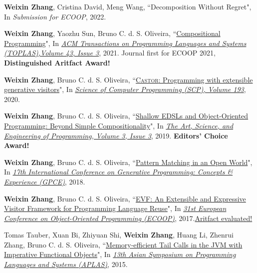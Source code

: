 \documentclass[paper=letter,fontsize=11pt]{scrartcl} %
\newcommand{\PaperEntry}[4]{
		\noindent #1, ``{#2}", In \textit{#3}, #4.} %
\begin{document}
\begin{etaremune}

\item \PaperEntry{\textbf{Weixin Zhang}, Cristina David, Meng Wang}{Decomposition Without Regret}{Submission for ECOOP}{2022}

\item \PaperEntry{\textbf{Weixin Zhang}, Yaozhu Sun, Bruno C. d. S.
    Oliveira}{\href{https://wxzh.github.io/papers/toplas2021.pdf}{Compositional Programming}}{\href{https://dx.doi.org/10.1145/3460228}{ACM Transactions on Programming Languages and Systems (TOPLAS),Volume 43, Issue 3}}{2021}{ Journal first for ECOOP 2021, \textbf{Distinguished Aritfact Award!}}

\item \PaperEntry{\textbf{Weixin Zhang}, Bruno C. d. S.
    Oliveira}{\href{https://wxzh.github.io/papers/scp2020.pdf}{\textsc{Castor}: Programming with extensible generative
    visitors}}{\href{https://doi.org/10.1016/j.scico.2020.102449}{Science of Computer Programming (SCP), Volume 193}}{2020} 

\item \PaperEntry{\textbf{Weixin Zhang}, Bruno C. d. S. Oliveira}{\href{https://wxzh.github.io/papers/programming19.pdf}{Shallow EDSLs
    and Object-Oriented Programming: Beyond Simple Compositionality}}{\href{https://programming-journal.org/2019/3/10/}{The Art,
    Science, and Engineering of Programming, Volume 3, Issue 3}}{2019}{ \textbf{Editors' Choice Award!}}

\item \PaperEntry{\textbf{Weixin Zhang}, Bruno C. d. S. Oliveira}{\href{https://wxzh.github.io/papers/gpce2018.pdf}{Pattern
    Matching in an Open World}}{\href{https://dl.acm.org/doi/10.1145/3278122.3278124}{17th International Conference on Generative Programming: Concepts \& Experience (GPCE)}}{2018}

\item \PaperEntry{\textbf{Weixin Zhang}, Bruno C. d. S. Oliveira}{\href{https://wxzh.github.io/papers/ecoop2017.pdf}{EVF: An Extensible and
    Expressive Visitor Framework for Programming Language Reuse}}{\href{https://2017.ecoop.org/track/ecoop-2017-papers}{31st European Conference on Object-Oriented Programming (ECOOP)}}{2017}{\href{https://2017.ecoop.org/track/ecoop-2017-Artifacts#accepted-artifacts}{Aritfact evaluated!}}

\item \PaperEntry{Tomas Tauber, Xuan Bi, Zhiyuan Shi, \textbf{Weixin Zhang}, Huang Li, Zhenrui Zhang, Bruno C. d. S. Oliveira}{\href{https://wxzh.github.io/papers/aplas2015.pdf}{Memory-efficient Tail Calls in the JVM with Imperative Functional Objects}}
{\href{https://link.springer.com/chapter/10.1007\%2F978-3-319-26529-2_2}{13th Asian Symposium on Programming Languages and Systems (APLAS)}}{2015}
\end{etaremune}
\end{document}
